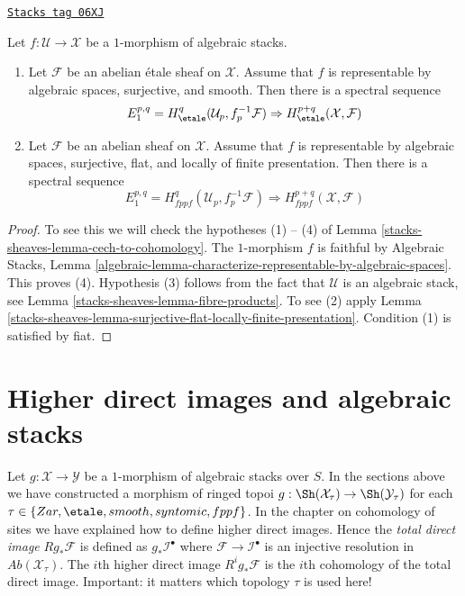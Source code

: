 \begin{proposition}
\label{stacks-sheaves-proposition-smooth-covering-compute-cohomology}
\href{https://stacks.math.columbia.edu/tag/06XJ}{\texttt{Stacks tag 06XJ}}


Let $f : \mathcal{U} \to \mathcal{X}$ be a $1$-morphism of algebraic stacks.
\begin{enumerate}
\item Let $\mathcal{F}$ be an abelian \'etale sheaf on $\mathcal{X}$.
Assume that $f$ is representable by algebraic spaces, surjective, and smooth.
Then there is a spectral sequence
$$
E_1^{p, q} = H^q_\etale(\mathcal{U}_p, f_p^{-1}\mathcal{F})
\Rightarrow
H^{p + q}_\etale(\mathcal{X}, \mathcal{F})
$$
\item Let $\mathcal{F}$ be an abelian sheaf on $\mathcal{X}$.
Assume that $f$ is representable by algebraic spaces, surjective, flat,
and locally of finite presentation. Then there is
a spectral sequence
$$
E_1^{p, q} = H^q_{fppf}(\mathcal{U}_p, f_p^{-1}\mathcal{F})
\Rightarrow
H^{p + q}_{fppf}(\mathcal{X}, \mathcal{F})
$$
\end{enumerate}
\end{proposition}

\begin{proof}
To see this we will check the hypotheses (1) -- (4) of
Lemma \ref{stacks-sheaves-lemma-cech-to-cohomology}.
The $1$-morphism $f$ is faithful by
Algebraic Stacks, Lemma
\ref{algebraic-lemma-characterize-representable-by-algebraic-spaces}.
This proves (4).
Hypothesis (3) follows from the fact that $\mathcal{U}$ is an algebraic
stack, see
Lemma \ref{stacks-sheaves-lemma-fibre-products}.
To see (2) apply
Lemma \ref{stacks-sheaves-lemma-surjective-flat-locally-finite-presentation}.
Condition (1) is satisfied by fiat.
\end{proof}

\section{Higher direct images and algebraic stacks}
\label{stacks-sheaves-section-higher-direct-images}
Let $g : \mathcal{X} \to \mathcal{Y}$ be a $1$-morphism of algebraic stacks
over $S$. In the sections above we have constructed a morphism of ringed
topoi $g : \Sh(\mathcal{X}_\tau) \to \Sh(\mathcal{Y}_\tau)$
for each $\tau \in \{Zar, \etale, smooth, syntomic, fppf\}$.
In the chapter on cohomology of sites we have explained how to
define higher direct images. Hence the {\it total direct image}
$Rg_*\mathcal{F}$ is defined as $g_*\mathcal{I}^\bullet$ where
$\mathcal{F} \to \mathcal{I}^\bullet$ is an injective resolution in
$\textit{Ab}(\mathcal{X}_\tau)$. The $i$th higher direct image
$R^ig_*\mathcal{F}$ is the $i$th cohomology of the total direct image.
Important: it matters which topology $\tau$ is used here!

